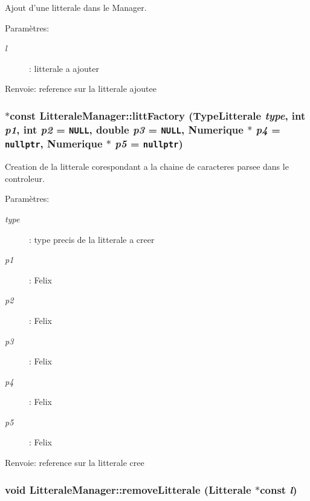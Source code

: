 Ajout d'une litterale dans le Manager. 

\begin{Desc}
\item[Paramètres:]
\begin{description}
\item[{\em l}]: litterale a ajouter \end{description}
\end{Desc}
\begin{Desc}
\item[Renvoie:]reference sur la litterale ajoutee \end{Desc}
\hypertarget{class_litterale_manager_ac254ffc8158f21899786e2133a6018d}{
\subsubsection[{littFactory}]{ $\ast$const LitteraleManager::littFactory (TypeLitterale {\em type}, \/  int {\em p1}, \/  int {\em p2} = {\tt NULL}, \/  double {\em p3} = {\tt NULL}, \/  {\bf Numerique} $\ast$ {\em p4} = {\tt nullptr}, \/  {\bf Numerique} $\ast$ {\em p5} = {\tt nullptr})}}
\label{class_litterale_manager_ac254ffc8158f21899786e2133a6018d}


Creation de la litterale corespondant a la chaine de caracteres parsee dans le controleur. 

\begin{Desc}
\item[Paramètres:]
\begin{description}
\item[{\em type}]: type precis de la litterale a creer \item[{\em p1}]: Felix \item[{\em p2}]: Felix \item[{\em p3}]: Felix \item[{\em p4}]: Felix \item[{\em p5}]: Felix \end{description}
\end{Desc}
\begin{Desc}
\item[Renvoie:]reference sur la litterale cree \end{Desc}
\hypertarget{class_litterale_manager_53bfb9871eed94f6c3e8f5f1e2a76e29}{
\subsubsection[{removeLitterale}]{\setlength{\rightskip}{0pt plus 5cm}void LitteraleManager::removeLitterale ({\bf Litterale} $\ast$const  {\em l})}}
\label{class_litterale_manager_53bfb9871eed94f6c3e8f5f1e2a76e29}


